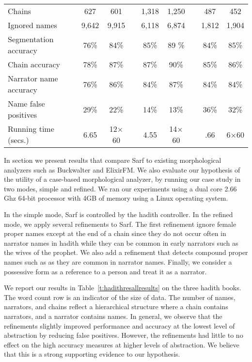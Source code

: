 \documentclass[11pt,letterpaper]{article}
\begin{document}
\begin{table*}[bt]
\begin{tabular}{lp{.2cm}ccp{.2cm}ccp{.2cm}cc}
Chains & & 627 & 601 &  & 1,318 & 1,250 & & 487 & 452 \\ 
Ignored names & & 9,642 & 9,915 &  & 6,118 & 6,874 & & 1,812 & 1,904 \\ \hline
Segmentation accuracy & & 76\%& 84\%& & 85\%& 89 \%& & 84\%& 85\%\\ 
Chain accuracy & & 78\% & 87\%&  & 87\%& 90\%& & 85\% & 86\% \\ 
Narrator name accuracy & & 76\% & 86\%& & 84\%& 87\% & & 84\% & 84\% \\ \hline
Name false positives & & 29\% & 22\%&  & 14\%& 13\% & & 36\% & 32\% \\ \hline
Running time (secs.)& & 6.65 & 12$\times$60& &4.55 & 14$\times$60 & & .66 & 6$\times$60 
\end{tabular}
\normalsize
\label{t:hadithresallresults}
\end{table*}

In section we present results that compare Sarf to existing 
morphological analyzers such as Buckwalter and ElixirFM. 
We also evaluate our hypothesis of the utility of a case-based 
morphological analyzer,
by running our case study in two modes, simple and refined.
We ran our experiments using a dual core 2.66 Ghz 64-bit processor 
with 4GB of memory using a Linux operating system. 

In the simple mode, Sarf is controlled by the hadith controller.
In the refined mode, we apply several refinements to Sarf.
The first refinement ignore female proper names except at the end of
a chain since they do not occur often in narrator names in hadith while
they can be common in early narrators such as the wives of the prophet.
We also add a refinement that detects compound proper names 
such as  
as they are common in narrator names.
Finally, we consider a possessive form as a reference to a person and treat
it as a narrator.

We report our results in Table~\ref{t:hadithresallresults} on the three hadith books.
The word count row is an indicator of the size of data.
The number of names, narrators, and chains reflect a hierarchical structure where a chain contains
narrators, and a narrator contains names.
In general, we observe that the refinements slightly improved performance and accuracy at
the lowest level of abstraction by reducing false positives.
However, the refinements had little to no effect on the high accuracy measures at higher
levels of abstraction.
We believe that this is a strong supporting evidence to our hypothesis.
\end{document}

